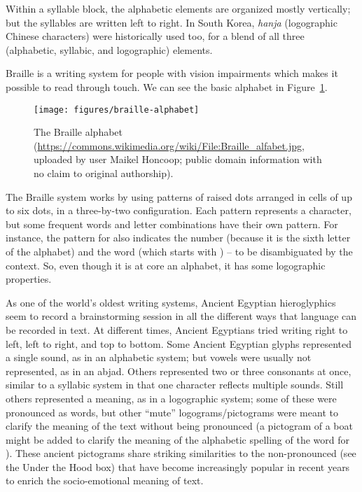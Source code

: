 Within a syllable block, the alphabetic elements are organized mostly vertically; but the syllables are written left to right. In South Korea, \emph{hanja}
(logographic Chinese characters) were historically used too, for a blend of all three (alphabetic, syllabic, and logographic) elements.
      

Braille is a writing system for people with vision impairments which makes it possible to read through touch.  We
can see the basic alphabet in Figure~\ref{fig:braille}.

\begin{figure}
\texttt{[image: figures/braille-alphabet]}
\caption{The Braille alphabet (\url{https://commons.wikimedia.org/wiki/File:Braille_alfabet.jpg},  uploaded by user Maikel Honcoop; public domain information with
no claim to original authorship).}
\label{fig:braille}
\end{figure}

The Braille system works by using patterns of raised dots arranged in
cells of up to six dots, in a three-by-two configuration.  Each pattern
represents a character, but some frequent words and letter
combinations have their own pattern.  For instance, the pattern for
 also indicates the number  (because it is the sixth letter of the alphabet) and the word  (which starts with ) -- to be disambiguated by the context.
So, even though it is at core an alphabet, it has some logographic
properties.

 
As one of the world's oldest writing systems, Ancient Egyptian hieroglyphics seem to record a brainstorming session in all the different ways that language  can be recorded in text.   At different times, Ancient Egyptians tried writing right to left, left to right, and top to bottom.  Some Ancient Egyptian glyphs represented a single sound, as in an alphabetic system; but vowels were usually not represented, as in an abjad.   Others represented two or three consonants at once, similar to a syllabic system in that one character reflects multiple sounds.  Still others represented a meaning, as in a logographic system; some of these were pronounced as words, but other ``mute'' logograms/pictograms were meant to clarify the meaning of the text without being pronounced (a pictogram of a boat might be added to clarify the meaning of the alphabetic spelling of the word for ).   These ancient pictograms share striking similarities to the non-pronounced  (see the Under the Hood box) that have become increasingly popular in recent years to enrich the socio-emotional meaning of text.

